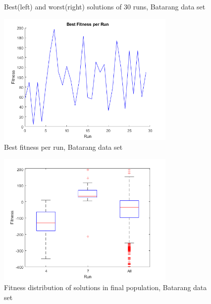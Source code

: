 \documentclass[conference]{IEEEtran}
\begin{document}
\begin{figure}[ht]
\centering
{}
\caption{Best(left) and worst(right) solutions of 30 runs, Batarang data set}
\label{fig:batarang_layout_best_worst}
\end{figure}

\begin{figure}[ht]
\centering
\includegraphics[width=3.4in]{dataset_batarang/best_fitness.png}
\caption{Best fitness per run, Batarang data set}
\label{fig:batarang_fitness_per_run}
\end{figure}

\begin{figure}[ht]
\centering
\includegraphics[width=3.4in]{dataset_batarang/boxplots.png}
\caption{Fitness distribution of solutions in final population, Batarang data set}
\label{fig:batarang_boxplots}
\end{figure}
\end{document}
